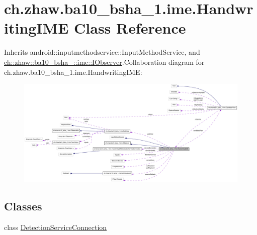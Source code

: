 \hypertarget{classch_1_1zhaw_1_1ba10__bsha__1_1_1ime_1_1HandwritingIME}{
\section{ch.zhaw.ba10\_\-bsha\_\-1.ime.HandwritingIME Class Reference}
\label{classch_1_1zhaw_1_1ba10__bsha__1_1_1ime_1_1HandwritingIME}
}


Inherits android::inputmethodservice::InputMethodService, and \hyperlink{interfacech_1_1zhaw_1_1ba10__bsha__1_1_1ime_1_1IObserver}{ch::zhaw::ba10\_\-bsha\_::ime::IObserver}.Collaboration diagram for ch.zhaw.ba10\_\-bsha\_\-1.ime.HandwritingIME:\nopagebreak
\begin{figure}[H]
\begin{center}
\leavevmode
\includegraphics[width=400pt]{classch_1_1zhaw_1_1ba10__bsha__1_1_1ime_1_1HandwritingIME__coll__graph}
\end{center}
\end{figure}
\subsection*{Classes}
\begin{DoxyCompactItemize}
\item 
class \hyperlink{classch_1_1zhaw_1_1ba10__bsha__1_1_1ime_1_1HandwritingIME_1_1DetectionServiceConnection}{DetectionServiceConnection}
\end{DoxyCompactItemize}
